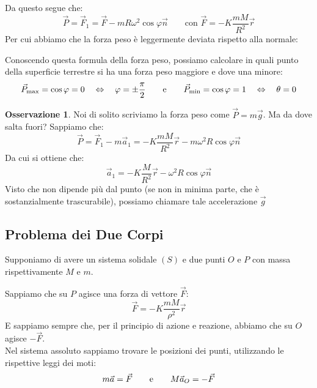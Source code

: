\documentclass[11pt,a4paper,twoside]{article}
\theoremstyle{definition}
\newtheorem*{oss}{Osservazione}
\begin{document}
Da questo segue che:
\[ \vec P = \vec F_1 = \vec F - mR\omega^2 \cos \varphi \vec n \qquad \text{con }\vec F = -K\frac{mM}{R^2}\vec r\]
Per cui abbiamo che la forza peso è leggermente deviata rispetto alla normale:
\begin{center}
\end{center}
Conoscendo questa formula della forza peso, possiamo calcolare in quali punto della superficie terrestre si ha una forza peso maggiore e dove una minore:
\[ \vec P_{\max} = \cos \varphi = 0 \quad \Leftrightarrow \quad \varphi = \pm \frac \pi 2 \qquad \text e \qquad \vec P_{\min} = \cos \varphi= 1 \quad \Leftrightarrow \quad \theta = 0\]

\begin{oss}
	Noi di solito scriviamo la forza peso come $\vec P = m\vec g$. Ma da dove salta fuori? Sappiamo che:
	\[ \vec P = \vec F_1 - m\vec a_1 = -K\frac{mM}{R^2}\vec r - m\omega^2 R \cos \varphi \vec n \]
	Da cui si ottiene che:
	\[ \vec a_1 = -K\frac{M}{R^2}\vec r - \omega^2 R \cos \varphi \vec n \]
	Visto che non dipende più dal punto (se non in minima parte, che è sostanzialmente trascurabile), possiamo chiamare tale accelerazione $\vec g$
\end{oss}

\subsection{Problema dei Due Corpi}

Supponiamo di avere un sistema solidale $(S)$ e due punti $O$ e $P$ con massa rispettivamente $M$ e $m$.
\begin{center}
\end{center}
Sappiamo che su $P$ agisce una forza di vettore $\vec F$:
\[ \vec F = -K\frac{mM}{\rho^2}\vec r \]
E sappiamo sempre che, per il principio di azione e reazione, abbiamo che su $O$ agisce $-\vec F$.\\
Nel sistema assoluto sappiamo trovare le posizioni dei punti, utilizzando le rispettive leggi dei moti:
\[ m\vec a = \vec F \qquad \text e \qquad M \vec a_O = - \vec F \]
\end{document}
